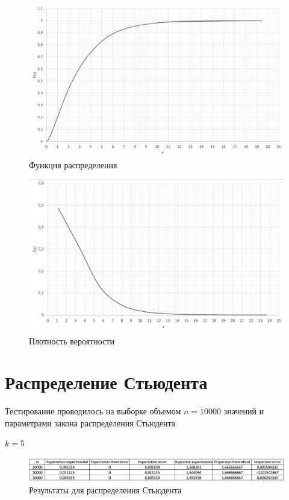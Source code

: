 \documentclass{article}
\begin{document}
		\begin{figure}[!htb]
		    \includegraphics[scale = 0.35]{chisq/2.png}
    		\caption{Функция распределения}
		\end{figure}
		 	 	
		\begin{figure}[!htb]
			\includegraphics[scale = 0.38]{chisq/3.png}
			\caption{Плотность вероятности}
   		\end{figure}
   	\newpage
   	
	\section{Распределение Стьюдента}
		Тестирование проводилось на выборке объемом $n = 10000$ значений и параметрами закона распределения Стьюдента
		\begin{center}
			$k = 5$\\
		\end{center}
		\begin{center}
			\begin{figure}[!htb]
				\includegraphics[scale = 0.51]{student/1.png}
				\caption{Результаты для распределения Стьюдента}
			\end{figure}
		\end{center}
		
\end{document}
